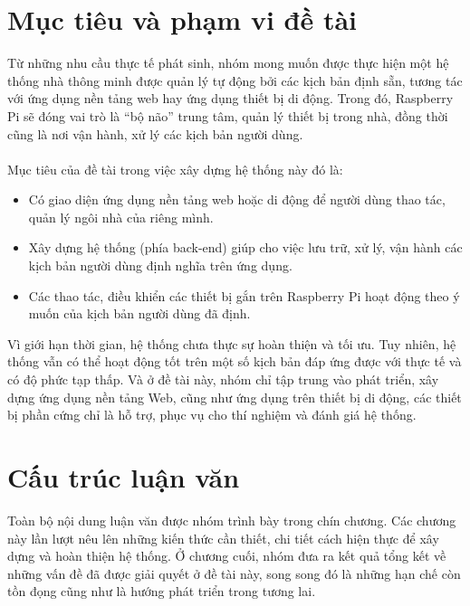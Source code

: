 \documentclass[12pt,a4paper,oneside]{extbook}
\begin{document}
\section{Mục tiêu và phạm vi đề tài}\label{thesis-target}
Từ những nhu cầu thực tế phát sinh, nhóm mong muốn được thực hiện một hệ thống nhà thông minh được quản lý tự động bởi các kịch bản định sẵn, tương tác với ứng dụng nền tảng web hay ứng dụng thiết bị di động. Trong đó, Raspberry Pi sẽ đóng vai trò là “bộ não” trung tâm, quản lý thiết bị trong nhà, đồng thời cũng là nơi vận hành, xử lý các kịch bản người dùng.\\\\
Mục tiêu của đề tài trong việc xây dựng hệ thống này đó là:

\begin{itemize}[topsep=1mm,itemsep=-0.5mm]
\item Có giao diện ứng dụng nền tảng web hoặc di động để người dùng thao tác, quản lý ngôi nhà của riêng mình.
\item Xây dựng hệ thống (phía back-end) giúp cho việc lưu trữ, xử lý, vận hành các kịch bản người dùng định nghĩa trên ứng dụng.
\item Các thao tác, điều khiển các thiết bị gắn trên Raspberry Pi hoạt động theo ý muốn của kịch bản người dùng đã định.
\vspace{1mm}
\end{itemize}

\noindent
Vì giới hạn thời gian, hệ thống chưa thực sự hoàn thiện và tối ưu. Tuy nhiên, hệ thống vẫn có thể hoạt động tốt trên một số kịch bản đáp ứng được với thực tế và có độ phức tạp thấp. Và ở đề tài này, nhóm chỉ tập trung vào phát triển, xây dựng ứng dụng nền tảng Web, cũng như ứng dụng trên thiết bị di động, các thiết bị phần cứng chỉ là hỗ trợ, phục vụ cho thí nghiệm và đánh giá hệ thống.

\section{Cấu trúc luận văn}
Toàn bộ nội dung luận văn được nhóm trình bày trong chín chương. Các chương này lần lượt nêu lên những kiến thức cần thiết, chi tiết cách hiện thực để xây dựng và hoàn thiện hệ thống. Ở chương cuối, nhóm đưa ra kết quả tổng kết về những vấn đề đã được giải quyết ở đề tài này, song song đó là những hạn chế còn tồn đọng cũng như là hướng phát triển trong tương lai.\\
\end{document}
